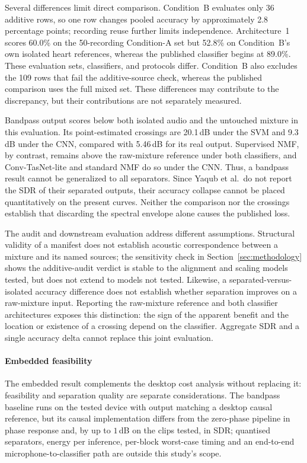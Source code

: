 \documentclass[journal]{IEEEtran}
\begin{document}
Several differences limit direct comparison. Condition~B evaluates only 36 additive rows, so one row changes pooled accuracy by approximately 2.8 percentage points; recording reuse further limits independence. Architecture~1 scores 60.0\% on the 50-recording Condition-A set but 52.8\% on Condition~B's own isolated heart references, whereas the published classifier begins at 89.0\%. These evaluation sets, classifiers, and protocols differ. Condition~B also excludes the 109 rows that fail the additive-source check, whereas the published comparison uses the full mixed set. These differences may contribute to the discrepancy, but their contributions are not separately measured.

Bandpass output scores below both isolated audio and the untouched mixture in this evaluation. Its point-estimated crossings are 20.1\,dB under the SVM and 9.3\,dB under the CNN, compared with 5.46\,dB for its real output. Supervised NMF, by contrast, remains above the raw-mixture reference under both classifiers, and Conv-TasNet-lite and standard NMF do so under the CNN. Thus, a bandpass result cannot be generalized to all separators. Since Yaqub et al.\ do not report the SDR of their separated outputs, their accuracy collapse cannot be placed quantitatively on the present curves. Neither the comparison nor the crossings establish that discarding the spectral envelope alone causes the published loss.

The audit and downstream evaluation address different assumptions. Structural validity of a manifest does not establish acoustic correspondence between a mixture and its named sources; the sensitivity check in Section~\ref{sec:methodology} shows the additive-audit verdict is stable to the alignment and scaling models tested, but does not extend to models not tested. Likewise, a separated-versus-isolated accuracy difference does not establish whether separation improves on a raw-mixture input. Reporting the raw-mixture reference and both classifier architectures exposes this distinction: the sign of the apparent benefit and the location or existence of a crossing depend on the classifier. Aggregate SDR and a single accuracy delta cannot replace this joint evaluation.

\paragraph{Embedded feasibility}
The embedded result complements the desktop cost analysis without replacing it: feasibility and separation quality are separate considerations. The bandpass baseline runs on the tested device with output matching a desktop causal reference, but its causal implementation differs from the zero-phase pipeline in phase response and, by up to $1$\,dB on the clips tested, in SDR; quantised separators, energy per inference, per-block worst-case timing and an end-to-end microphone-to-classifier path are outside this study's scope.
\end{document}
